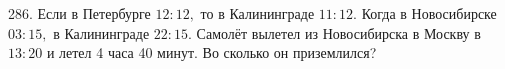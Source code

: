 286. Если в Петербурге $12:12,$ то в Калининграде $11:12.$ Когда в Новосибирске $03:15,$ в Калининграде $22:15.$ Самолёт вылетел из Новосибирска в Москву в $13:20$ и летел 4 часа 40 минут. Во сколько он приземлился?\\
